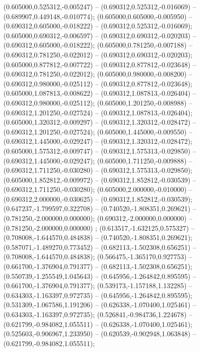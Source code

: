  (0.605000,0.525312,-0.005247) -- (0.690312,0.525312,-0.016069) -- (0.689907,0.449148,-0.010774);
 (0.605000,0.605000,-0.005950) -- (0.690312,0.605000,-0.018222) -- (0.690312,0.525312,-0.016069);
 (0.605000,0.690312,-0.006597) -- (0.690312,0.690312,-0.020203) -- (0.690312,0.605000,-0.018222);
 (0.605000,0.781250,-0.007188) -- (0.690312,0.781250,-0.022012) -- (0.690312,0.690312,-0.020203);
 (0.605000,0.877812,-0.007722) -- (0.690312,0.877812,-0.023648) -- (0.690312,0.781250,-0.022012);
 (0.605000,0.980000,-0.008200) -- (0.690312,0.980000,-0.025112) -- (0.690312,0.877812,-0.023648);
 (0.605000,1.087813,-0.008622) -- (0.690312,1.087813,-0.026404) -- (0.690312,0.980000,-0.025112);
 (0.605000,1.201250,-0.008988) -- (0.690312,1.201250,-0.027524) -- (0.690312,1.087813,-0.026404);
 (0.605000,1.320312,-0.009297) -- (0.690312,1.320312,-0.028472) -- (0.690312,1.201250,-0.027524);
 (0.605000,1.445000,-0.009550) -- (0.690312,1.445000,-0.029247) -- (0.690312,1.320312,-0.028472);
 (0.605000,1.575312,-0.009747) -- (0.690312,1.575313,-0.029850) -- (0.690312,1.445000,-0.029247);
 (0.605000,1.711250,-0.009888) -- (0.690312,1.711250,-0.030280) -- (0.690312,1.575313,-0.029850);
 (0.605000,1.852812,-0.009972) -- (0.690312,1.852812,-0.030539) -- (0.690312,1.711250,-0.030280);
 (0.605000,2.000000,-0.010000) -- (0.690312,2.000000,-0.030625) -- (0.690312,1.852812,-0.030539);
 (0.647237,-1.799597,0.322708) -- (0.740520,-1.808351,0.269621) -- (0.781250,-2.000000,0.000000);
 (0.690312,-2.000000,0.000000) -- (0.781250,-2.000000,0.000000) ;
 (0.613517,-1.632125,0.575327) -- (0.708008,-1.644570,0.484838) -- (0.740520,-1.808351,0.269621);
 (0.587071,-1.489270,0.773452) -- (0.682113,-1.502308,0.656251) -- (0.708008,-1.644570,0.484838);
 (0.566475,-1.365170,0.927753) -- (0.661700,-1.376904,0.791377) -- (0.682113,-1.502308,0.656251);
 (0.550739,-1.255549,1.045643) -- (0.645956,-1.264842,0.895595) -- (0.661700,-1.376904,0.791377);
 (0.539173,-1.157188,1.132285) -- (0.634303,-1.163397,0.972735) -- (0.645956,-1.264842,0.895595);
 (0.531309,-1.067586,1.191206) -- (0.626338,-1.070400,1.025461) -- (0.634303,-1.163397,0.972735);
 (0.526841,-0.984736,1.224678) -- (0.621799,-0.984082,1.055511) -- (0.626338,-1.070400,1.025461);
 (0.525603,-0.906967,1.233950) -- (0.620539,-0.902948,1.063848) -- (0.621799,-0.984082,1.055511);
